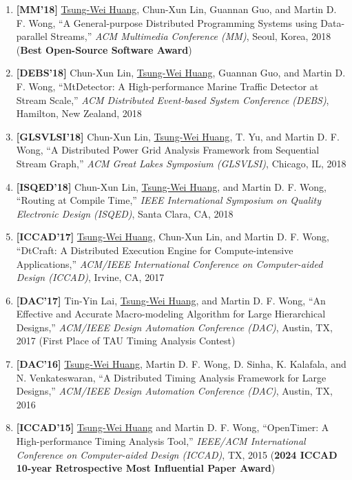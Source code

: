 \documentclass[A4,11pt]{article}
\begin{document}
\begin{enumerate}
    \item \textbf{[MM'18]} \underline{Tsung-Wei Huang}, Chun-Xun Lin, Guannan Guo, and Martin D. F. Wong, ``A General-purpose Distributed Programming Systems using Data-parallel Streams,'' \textit{ACM Multimedia Conference (MM)}, Seoul, Korea, 2018 (\textbf{Best Open-Source Software Award}) 

    \item \textbf{[DEBS'18]} Chun-Xun Lin, \underline{Tsung-Wei Huang}, Guannan Guo, and Martin D. F. Wong, ``MtDetector: A High-performance Marine Traffic Detector at Stream Scale,'' \textit{ACM Distributed Event-based System Conference (DEBS)}, Hamilton, New Zealand, 2018

    \item \textbf{[GLSVLSI'18]} Chun-Xun Lin, \underline{Tsung-Wei Huang}, T. Yu, and Martin D. F. Wong, ``A Distributed Power Grid Analysis Framework from Sequential Stream Graph,'' \textit{ACM Great Lakes Symposium (GLSVLSI)}, Chicago, IL, 2018

    \item \textbf{[ISQED'18]} Chun-Xun Lin, \underline{Tsung-Wei Huang}, and Martin D. F. Wong, ``Routing at Compile Time,'' \textit{IEEE International Symposium on Quality Electronic Design (ISQED)}, Santa Clara, CA, 2018

    \item \textbf{[ICCAD'17]} \underline{Tsung-Wei Huang}, Chun-Xun Lin, and Martin D. F. Wong, ``DtCraft: A Distributed Execution Engine for Compute-intensive Applications,'' \textit{ACM/IEEE International Conference on Computer-aided Design (ICCAD)}, Irvine, CA, 2017

    \item \textbf{[DAC'17]} Tin-Yin Lai, \underline{Tsung-Wei Huang}, and Martin D. F. Wong, ``An Effective and Accurate Macro-modeling Algorithm for Large Hierarchical Designs,'' \textit{ACM/IEEE Design Automation Conference (DAC)}, Austin, TX, 2017 (First Place of TAU Timing Analysis Contest)

    \item \textbf{[DAC'16]} \underline{Tsung-Wei Huang}, Martin D. F. Wong, D. Sinha, K. Kalafala, and N. Venkateswaran, ``A Distributed Timing Analysis Framework for Large Designs,'' \textit{ACM/IEEE Design Automation Conference (DAC)}, Austin, TX, 2016

    \item \textbf{[ICCAD'15]} \underline{Tsung-Wei Huang} and Martin D. F. Wong, ``OpenTimer: A High-performance Timing Analysis Tool,'' \textit{IEEE/ACM International Conference on Computer-aided Design (ICCAD)}, TX, 2015 (\textbf{2024 ICCAD 10-year Retrospective Most Influential Paper Award})


\end{enumerate}
\end{document}

